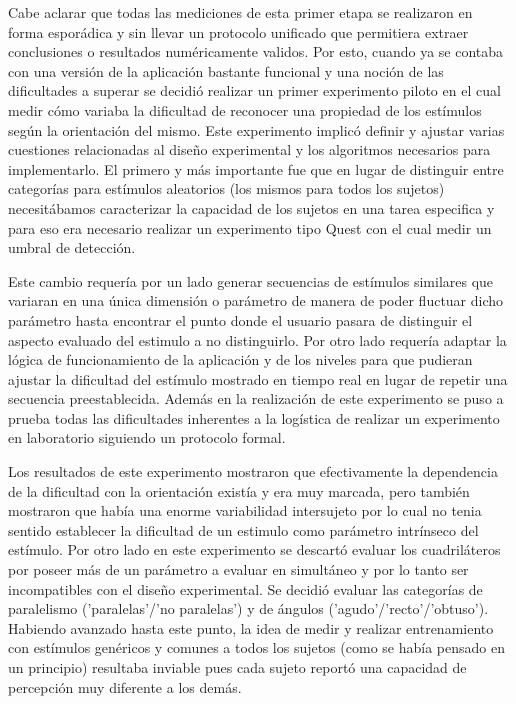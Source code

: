 \documentclass{article}
\numberwithin{figure}{section}
\begin{document}
    Cabe aclarar que todas las mediciones de esta primer etapa se realizaron en forma esporádica y sin llevar un protocolo unificado que permitiera extraer conclusiones o resultados numéricamente validos. Por esto, cuando ya se contaba con una versión de la aplicación bastante funcional y una noción de las dificultades a superar se decidió realizar un primer experimento piloto en el cual medir cómo variaba la dificultad de reconocer una propiedad de los estímulos según la orientación del mismo. Este experimento implicó definir y ajustar varias cuestiones relacionadas al diseño experimental y los algoritmos necesarios para implementarlo. El primero y más importante fue que en lugar de distinguir entre categorías para estímulos aleatorios (los mismos para todos los sujetos) necesitábamos caracterizar la capacidad de los sujetos en una tarea especifica y para eso era necesario realizar un experimento tipo Quest con el cual medir un umbral de detección. 
    
    Este cambio requería por un lado generar secuencias de estímulos similares que variaran en una única dimensión o parámetro de manera de poder fluctuar dicho parámetro hasta encontrar el punto donde el usuario pasara de distinguir el aspecto evaluado del estimulo a no distinguirlo. Por otro lado requería adaptar la lógica de funcionamiento de la aplicación y de los niveles para que pudieran ajustar la dificultad del estímulo mostrado en tiempo real en lugar de repetir una secuencia preestablecida. Además en la realización de este experimento se puso a prueba todas las dificultades inherentes a la logística de realizar un experimento en laboratorio siguiendo un protocolo formal.
    
    Los resultados de este experimento mostraron que efectivamente la dependencia de la dificultad con la orientación existía y era muy marcada, pero también mostraron que había una enorme variabilidad intersujeto por lo cual no tenia sentido establecer la dificultad de un estimulo como parámetro intrínseco del estímulo. Por otro lado en este experimento se descartó evaluar los cuadriláteros por poseer más de un parámetro a evaluar en simultáneo y por lo tanto ser incompatibles con el diseño experimental. Se decidió evaluar las categorías de paralelismo ('paralelas'/'no paralelas') y de ángulos ('agudo'/'recto'/'obtuso'). Habiendo avanzado hasta este punto, la idea de medir y realizar entrenamiento con estímulos genéricos y comunes a todos los sujetos (como se había pensado en un principio) resultaba inviable pues cada sujeto reportó una capacidad de percepción muy diferente a los demás. 
    
\end{document}
